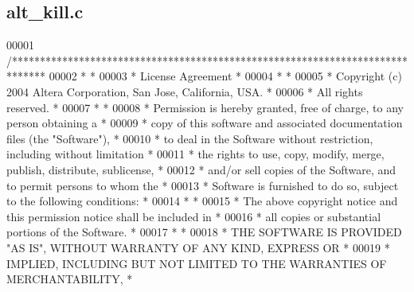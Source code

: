 \subsection{alt\+\_\+kill.\+c}
\label{alt__kill_8c_source}

\begin{DoxyCode}
00001 \textcolor{comment}{/******************************************************************************}
00002 \textcolor{comment}{*                                                                             *}
00003 \textcolor{comment}{* License Agreement                                                           *}
00004 \textcolor{comment}{*                                                                             *}
00005 \textcolor{comment}{* Copyright (c) 2004 Altera Corporation, San Jose, California, USA.           *}
00006 \textcolor{comment}{* All rights reserved.                                                        *}
00007 \textcolor{comment}{*                                                                             *}
00008 \textcolor{comment}{* Permission is hereby granted, free of charge, to any person obtaining a     *}
00009 \textcolor{comment}{* copy of this software and associated documentation files (the "Software"),  *}
00010 \textcolor{comment}{* to deal in the Software without restriction, including without limitation   *}
00011 \textcolor{comment}{* the rights to use, copy, modify, merge, publish, distribute, sublicense,    *}
00012 \textcolor{comment}{* and/or sell copies of the Software, and to permit persons to whom the       *}
00013 \textcolor{comment}{* Software is furnished to do so, subject to the following conditions:        *}
00014 \textcolor{comment}{*                                                                             *}
00015 \textcolor{comment}{* The above copyright notice and this permission notice shall be included in  *}
00016 \textcolor{comment}{* all copies or substantial portions of the Software.                         *}
00017 \textcolor{comment}{*                                                                             *}
00018 \textcolor{comment}{* THE SOFTWARE IS PROVIDED "AS IS", WITHOUT WARRANTY OF ANY KIND, EXPRESS OR  *}
00019 \textcolor{comment}{* IMPLIED, INCLUDING BUT NOT LIMITED TO THE WARRANTIES OF MERCHANTABILITY,    *}

\end{DoxyCode}
